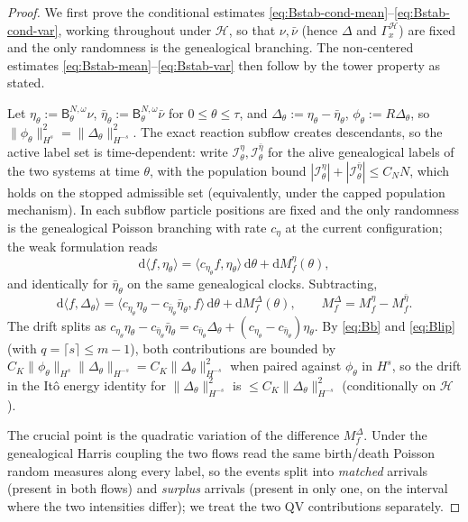 \documentclass[a4paper,fleqn]{cas-sc}
\theoremstyle{definition}
\theoremstyle{remark}
\begin{document}
\begin{proof}
We first prove the conditional estimates
\eqref{eq:Bstab-cond-mean}--\eqref{eq:Bstab-cond-var}, working throughout under
$\mathcal H$, so that $\nu,\bar\nu$ (hence $\Delta$ and $\Gamma_x^{\mathcal H}$)
are fixed and the only randomness is the genealogical branching. The non-centered
estimates \eqref{eq:Bstab-mean}--\eqref{eq:Bstab-var} then follow by the tower
property as stated.

Let $\eta_\theta:=\mathsf B^{N,\omega}_\theta\nu$,
$\bar\eta_\theta:=\mathsf B^{N,\omega}_\theta\bar\nu$ for $0\le\theta\le\tau$, and
$\Delta_\theta:=\eta_\theta-\bar\eta_\theta$, $\phi_\theta:=R\Delta_\theta$, so
$\|\phi_\theta\|_{H^s}^2=\|\Delta_\theta\|_{H^{-s}}^2$. The exact reaction subflow
creates descendants, so the active label set is time-dependent: write
$\mathcal I^\eta_\theta,\mathcal I^{\bar\eta}_\theta$ for the alive genealogical
labels of the two systems at time $\theta$, with the population bound
$|\mathcal I^\eta_\theta|+|\mathcal I^{\bar\eta}_\theta|\le C_NN$, which holds on the
stopped admissible set (equivalently, under the capped population mechanism). In each
subflow particle positions are fixed and the only randomness is the genealogical
Poisson branching with rate $c_\eta$ at the current configuration; the weak
formulation reads
\[
\mathrm d\langle f,\eta_\theta\rangle
=\langle c_{\eta_\theta}f,\eta_\theta\rangle\,\mathrm d\theta
+\mathrm dM^\eta_f(\theta),
\]
and identically for $\bar\eta_\theta$ on the same genealogical clocks. Subtracting,
\[
\mathrm d\langle f,\Delta_\theta\rangle
=\langle c_{\eta_\theta}\eta_\theta-c_{\bar\eta_\theta}\bar\eta_\theta,f\rangle\,\mathrm d\theta
+\mathrm dM^\Delta_f(\theta),
\qquad M^\Delta_f=M^\eta_f-M^{\bar\eta}_f.
\]
The drift splits as
$c_{\eta_\theta}\eta_\theta-c_{\bar\eta_\theta}\bar\eta_\theta
=c_{\bar\eta_\theta}\Delta_\theta+(c_{\eta_\theta}-c_{\bar\eta_\theta})\eta_\theta$.
By \eqref{eq:Bb} and \eqref{eq:Blip} (with $q=\lceil s\rceil\le m-1$), both
contributions are bounded by $C_K\|\phi_\theta\|_{H^s}\|\Delta_\theta\|_{H^{-s}}
=C_K\|\Delta_\theta\|_{H^{-s}}^2$ when paired against $\phi_\theta$ in $H^s$, so
the drift in the It\^o energy identity for $\|\Delta_\theta\|_{H^{-s}}^2$ is
$\le C_K\|\Delta_\theta\|_{H^{-s}}^2$ (conditionally on $\mathcal H$).

The crucial point is the quadratic variation of the difference $M^\Delta_f$.
Under the genealogical Harris coupling the two flows read the same birth/death
Poisson random measures along every label, so the events split into
\emph{matched} arrivals (present in both flows) and \emph{surplus} arrivals
(present in only one, on the interval where the two intensities differ); we treat
the two QV contributions separately.


\end{proof}
\end{document}
